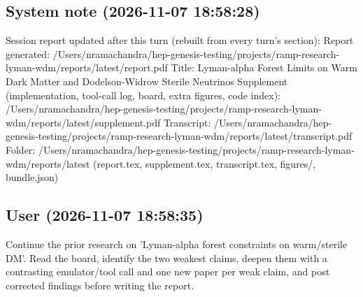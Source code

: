 \documentclass[11pt,a4paper]{article}
\begin{document}
\subsection*{System note \small(2026-11-07 18:58:28)}
Session report updated after this turn (rebuilt from every turn's section): Report generated: /Users/nramachandra/hep-genesis-testing/projects/ramp-research-lyman-wdm/reports/latest/report.pdf Title: Lyman-alpha Forest Limits on Warm Dark Matter and Dodelson-Widrow Sterile Neutrinos Supplement (implementation, tool-call log, board, extra figures, code index): /Users/nramachandra/hep-genesis-testing/projects/ramp-research-lyman-wdm/reports/latest/supplement.pdf Transcript: /Users/nramachandra/hep-genesis-testing/projects/ramp-research-lyman-wdm/reports/latest/transcript.pdf Folder: /Users/nramachandra/hep-genesis-testing/projects/ramp-research-lyman-wdm/reports/latest (report.tex, supplement.tex, transcript.tex, figures/, bundle.json)

\subsection*{User \small(2026-11-07 18:58:35)}
Continue the prior research on 'Lyman-alpha forest constraints on warm/sterile DM'. Read the board, identify the two weakest claims, deepen them with a contrasting emulator/tool call and one new paper per weak claim, and post corrected findings before writing the report.
\end{document}
